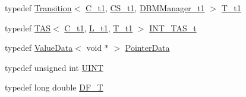\begin{DoxyCompactItemize}
\item 
typedef \mbox{\hyperlink{classgraphsat_1_1_transition}{Transition}}$<$ \mbox{\hyperlink{namespacegraphsat_af82e57b58a5af8441762469b70c475da}{C\+\_\+t1}}, \mbox{\hyperlink{namespacegraphsat_a6a55464bf94f0ab98539fd8c3b66c603}{C\+S\+\_\+t1}}, \mbox{\hyperlink{namespacegraphsat_abe6691ac6002381e0250076f52d17b09}{D\+B\+M\+Manager\+\_\+t1}} $>$ \mbox{\hyperlink{namespacegraphsat_af60e45e80e42bfeebed3cb349a68905f}{T\+\_\+t1}}
\item 
typedef \mbox{\hyperlink{classgraphsat_1_1_t_a_s}{T\+AS}}$<$ \mbox{\hyperlink{namespacegraphsat_af82e57b58a5af8441762469b70c475da}{C\+\_\+t1}}, \mbox{\hyperlink{namespacegraphsat_a73a6ad304c41491a8939153273e88398}{L\+\_\+t1}}, \mbox{\hyperlink{namespacegraphsat_af60e45e80e42bfeebed3cb349a68905f}{T\+\_\+t1}} $>$ \mbox{\hyperlink{namespacegraphsat_a72468138834e9a7182f32fed8035a2de}{I\+N\+T\+\_\+\+T\+A\+S\+\_\+t}}
\item 
typedef \mbox{\hyperlink{classgraphsat_1_1_value_data}{Value\+Data}}$<$ void $\ast$ $>$ \mbox{\hyperlink{namespacegraphsat_a107ef8404e59d9b9e5c375face044c42}{Pointer\+Data}}
\item 
typedef unsigned int \mbox{\hyperlink{namespacegraphsat_aa3b3d61a8c27ffc03448c5e1f3a76aed}{U\+I\+NT}}
\item 
typedef long double \mbox{\hyperlink{namespacegraphsat_a9d75165dd4e82d2e03ffd07fe27533d0}{D\+F\+\_\+T}}
\end{DoxyCompactItemize}
